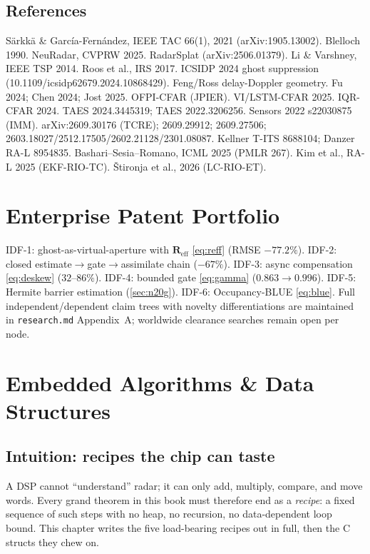 \documentclass[11pt,oneside]{book}
\begin{document}
\section{References}
\label{sec:refs}

S\"arkk\"a \& Garc\'ia-Fern\'andez, IEEE TAC 66(1), 2021
(arXiv:1905.13002). Blelloch 1990. NeuRadar, CVPRW 2025. RadarSplat
(arXiv:2506.01379). Li \& Varshney, IEEE TSP 2014. Roos et al., IRS 2017.
ICSIDP 2024 ghost suppression (10.1109/icsidp62679.2024.10868429). Feng/Ross
delay-Doppler geometry. Fu 2024; Chen 2024; Jost 2025. OFPI-CFAR (JPIER).
VI/LSTM-CFAR 2025. IQR-CFAR 2024. TAES 2024.3445319; TAES 2022.3206256.
Sensors 2022 s22030875 (IMM). arXiv:2609.30176 (TCRE); 2609.29912;
2609.27506; 2603.18027/2512.17505/2602.21128/2301.08087. Kellner T-ITS
8688104; Danzer RA-L 8954835. Bashari--Sesia--Romano, ICML 2025 (PMLR 267).
Kim et al., RA-L 2025 (EKF-RIO-TC). \v{S}tironja et al., 2026 (LC-RIO-ET).

\chapter{Enterprise Patent Portfolio}
\label{ch:idf}

IDF-1: ghost-as-virtual-aperture with $\mathbf{R}_{\mathrm{eff}}$
\cref{eq:reff} (RMSE $-77.2\%$). IDF-2: closed estimate$\to$gate$\to$assimilate
chain ($-67\%$). IDF-3: async compensation \cref{eq:deskew} ($32$--$86\%$).
IDF-4: bounded gate \cref{eq:gamma} ($0.863\to0.996$). IDF-5: Hermite barrier
estimation (\cref{sec:n20g}). IDF-6: Occupancy-BLUE \cref{eq:blue}. Full
independent/dependent claim trees with novelty differentiations are maintained
in \texttt{research.md} Appendix~A; worldwide clearance searches remain open
per node.

\chapter{Embedded Algorithms \& Data Structures}
\label{ch:algorithms}

\section{Intuition: recipes the chip can taste}
\label{sec:recipes}

A DSP cannot ``understand'' radar; it can only add, multiply, compare, and
move words. Every grand theorem in this book must therefore end as a
\emph{recipe}: a fixed sequence of such steps with no heap, no recursion,
no data-dependent loop bound. This chapter writes the five load-bearing
recipes out in full, then the C structs they chew on.
\end{document}
